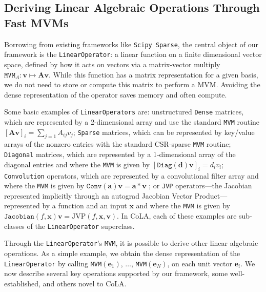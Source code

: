 \documentclass{article}
\newcommand{\mbf}[1]{{\boldsymbol{\mathbf{#1}}}}
\renewcommand{\bm}{\mbf}
\begin{document}
\subsection{Deriving Linear Algebraic Operations Through Fast MVMs}\label{subsec:linops_core}

Borrowing from existing frameworks like \texttt{Scipy Sparse}, the central object of our framework is the \texttt{LinearOperator}: a linear function on a finite dimensional vector space, defined by how it acts on vectors via a matrix-vector multiply $\texttt{MVM}_A: \bm{v} \mapsto \bm{A} \bm{v}$.
While this function has a matrix representation for a given basis, we do not need to store or compute this matrix to perform a MVM.
Avoiding the dense representation of the operator saves memory and often compute.

Some basic examples of \texttt{LinearOperators} are:
unstructured \texttt{Dense} matrices, which are represented by a 2-dimensional array and use the standard \texttt{MVM} routine $\left[\bm{A} \bm{v}\right]_{i} = \sum_{j=1} A_{ij} v_{j}$;
\texttt{Sparse} matrices, which can be represented by key/value arrays of the nonzero entries with the standard CSR-sparse \texttt{MVM} routine;
\texttt{Diagonal} matrices,
which are represented by a 1-dimensional array of the diagonal entries and where the \texttt{MVM} is given by $\left[\bm{\texttt{Diag}}(\bm{d}) \bm{v}\right]_{i} = d_i v_{i}$;
\texttt{Convolution} operators,
which are represented by a convolutional filter array and where the \texttt{MVM} is given by $\texttt{Conv}(\bm a) \bm{v} = \bm{a} * \bm{v}$ ; or
\texttt{JVP} operators---the Jacobian represented implicitly through an autograd Jacobian Vector Product---represented by a function and an input $\bm{x}$ and where the \texttt{MVM} is given by $\texttt{Jacobian}(f,\bm{x})\bm{v} = \mathrm{JVP}(f,\bm{x},\bm{v})$.
In CoLA, each of these examples are sub-classes of the \texttt{LinearOperator} superclass.

Through the \texttt{LinearOperator}'s \texttt{MVM}, it is possible to derive other linear algebraic operations.
As a simple example, we obtain the dense representation of the \texttt{LinearOperator} by calling \texttt{MVM}$(\bm e_1)$, $\ldots$,
\texttt{MVM}$(\bm e_N)$, on each unit vector $\bm e_i$. We now describe several key operations supported by our framework, some well-established, and others novel to CoLA.
\end{document}
